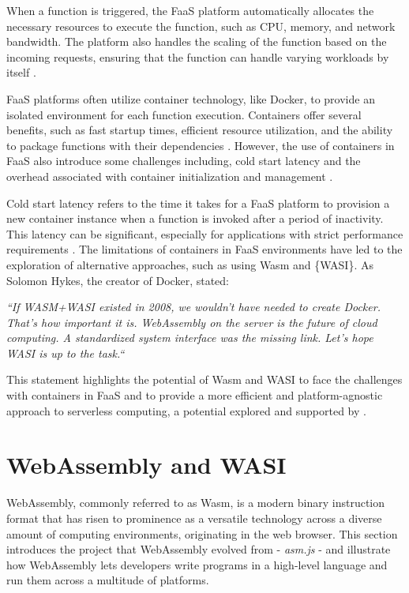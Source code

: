 \documentclass[
  table]{report}
\begin{document}
When a function is triggered, the FaaS platform automatically allocates
the necessary resources to execute the function, such as CPU, memory,
and network bandwidth. The platform also handles the scaling of the
function based on the incoming requests, ensuring that the function can
handle varying workloads by itself
\citep{mcgrathServerlessComputingDesign2017}.

FaaS platforms often utilize container technology, like Docker, to
provide an isolated environment for each function execution. Containers
offer several benefits, such as fast startup times, efficient resource
utilization, and the ability to package functions with their
dependencies \citep{vaneykServerlessMorePaaS2018}. However, the use of
containers in FaaS also introduce some challenges including, cold start
latency and the overhead associated with container initialization and
management \citep{wangPeekingCurtainsServerless2018}.

Cold start latency refers to the time it takes for a FaaS platform to
provision a new container instance when a function is invoked after a
period of inactivity. This latency can be significant, especially for
applications with strict performance requirements
\citep{wangPeekingCurtainsServerless2018}. The limitations of containers
in FaaS environments have led to the exploration of alternative
approaches, such as using \ac{Wasm} and \{WASI\}. As Solomon Hykes, the
creator of Docker, stated:

\begin{displayquote}
\textit{ ``If WASM+WASI existed in 2008, we wouldn't have needed to create Docker.
That's how important it is. WebAssembly on the server is the future of cloud
computing. A standardized system interface was the missing link. Let's hope WASI
is up to the task.`` \citep{hykesOne2019} }
\end{displayquote}

This statement highlights the potential of \ac{Wasm} and \ac{WASI} to
face the challenges with containers in FaaS and to provide a more
efficient and platform-agnostic approach to serverless computing, a
potential explored and supported by
\citet{kjorveziroskiEvaluatingWebAssemblyOrchestrated2022}.

\section{WebAssembly and WASI}
\label{sect:wasmwasi}

WebAssembly, commonly referred to as Wasm, is a modern binary
instruction format that has risen to prominence as a versatile
technology across a diverse amount of computing environments,
originating in the web browser. This section introduces the project that
WebAssembly evolved from - \emph{asm.js} - and illustrate how
WebAssembly lets developers write programs in a high-level language and
run them across a multitude of platforms.
\end{document}
